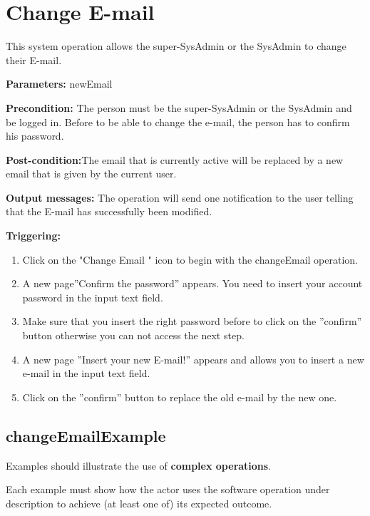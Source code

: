\section{Change E-mail}
\label{operation:changeEmail}
This system operation allows the super-SysAdmin or the SysAdmin to change
their E-mail.

\begin{description}

\item \textbf{Parameters:} newEmail
\item \textbf{Precondition:} The person must be the super-SysAdmin or the
SysAdmin and be logged in. Before to be able to change the e-mail, the person
has to confirm his password.
\item \textbf{Post-condition:}The email that is currently active will be
replaced by a new email that is given by the current user.
\item \textbf{Output messages:} The operation will send one notification to the
user telling that the E-mail has successfully been modified.


\item \textbf{Triggering:}
\begin{enumerate}
\item Click on the "Change Email " icon to begin with the changeEmail operation. 
\item A new page''Confirm the password'' appears. You need to insert your
account password in the input text field. 
\item Make sure that you insert the right password before to click on the
''confirm'' button otherwise you can not access the next step.
\item A new page ''Insert your new E-mail!'' appears and allows you to
insert a new e-mail in the input text field.
\item Click on the ''confirm'' button to replace the old e-mail by the new one.

\end{enumerate}

 
\end{description}

 
\subsection{changeEmailExample}
Examples should illustrate the use of \textbf{complex operations}.

Each example must show how the actor uses the software operation under
description to achieve (at least one of) its expected outcome.

